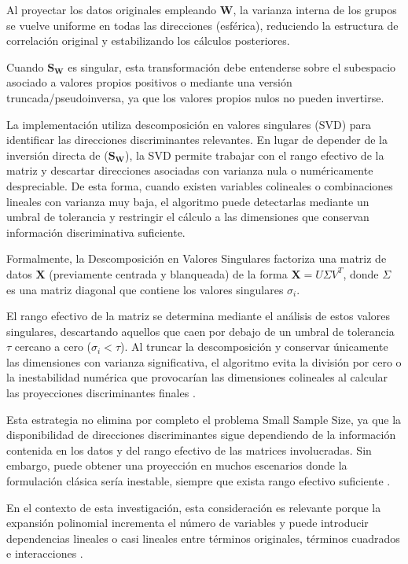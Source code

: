Al proyectar los datos originales empleando $\mathbf{W}$, la varianza interna de los grupos se vuelve uniforme en todas las direcciones (esférica), reduciendo la estructura de correlación original y estabilizando los cálculos posteriores.

Cuando $\mathbf{S_W}$ es singular, esta transformación debe entenderse sobre el subespacio asociado a valores propios positivos o mediante una versión truncada/pseudoinversa, ya que los valores propios nulos no pueden invertirse.

La implementación utiliza descomposición en valores singulares (SVD) para identificar las direcciones discriminantes relevantes. En lugar de depender de la inversión directa de ($\mathbf{S_W}$), la SVD permite trabajar con el rango efectivo de la matriz y descartar direcciones asociadas con varianza nula o numéricamente despreciable. De esta forma, cuando existen variables colineales o combinaciones lineales con varianza muy baja, el algoritmo puede detectarlas mediante un umbral de tolerancia y restringir el cálculo a las dimensiones que conservan información discriminativa suficiente.

Formalmente, la Descomposición en Valores Singulares factoriza una matriz de datos $\mathbf{X}$ (previamente centrada y blanqueada) de la forma $\mathbf{X} = U \Sigma V^T$, donde $\Sigma$ es una matriz diagonal que contiene los valores singulares $\sigma_i$. 

El rango efectivo de la matriz se determina mediante el análisis de estos valores singulares, descartando aquellos que caen por debajo de un umbral de tolerancia $\tau$ cercano a cero ($\sigma_i < \tau$). Al truncar la descomposición y conservar únicamente las dimensiones con varianza significativa, el algoritmo evita la división por cero o la inestabilidad numérica que provocarían las dimensiones colineales al calcular las proyecciones discriminantes finales \cite{golub2013matrix}.

Esta estrategia no elimina por completo el problema Small Sample Size, ya que la disponibilidad de direcciones discriminantes sigue dependiendo de la información contenida en los datos y del rango efectivo de las matrices involucradas. Sin embargo, puede obtener una proyección en muchos escenarios donde la formulación clásica sería inestable, siempre que exista rango efectivo suficiente \cite{krzanowski1995discriminant}.

En el contexto de esta investigación, esta consideración es relevante porque la expansión polinomial incrementa el número de variables y puede introducir dependencias lineales o casi lineales entre términos originales, términos cuadrados e interacciones \cite{montgomery2022introduction}. 

